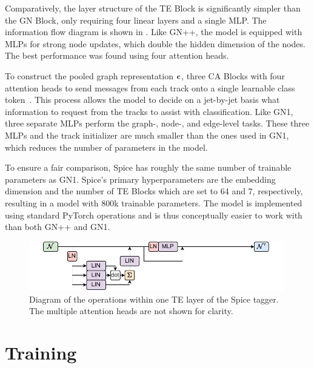 Comparatively, the layer structure of the TE Block is significantly simpler than the GN Block, only requiring four linear layers and a single MLP\@.
The information flow diagram is shown in .
Like GN++, the model is equipped with MLPs for strong node updates, which double the hidden dimension of the nodes.
The best performance was found using four attention heads.

To construct the pooled graph representation $\mathbf{c}$, three CA Blocks with four attention heads to send messages from each track onto a single learnable class token~\cite{GoingDeeper}.
This process allows the model to decide on a jet-by-jet basis what information to request from the tracks to assist with classification.
Like GN1, three separate MLPs perform the graph-, node-, and edge-level tasks.
These three MLPs and the track initializer are much smaller than the ones used in GN1, which reduces the number of parameters in the model.

To ensure a fair comparison, Spice has roughly the same number of trainable parameters as GN1.
Spice's primary hyperparameters are the embedding dimension and the number of TE Blocks which are set to 64 and 7, respectively, resulting in a model with 800k trainable parameters.
The model is implemented using standard PyTorch operations and is thus conceptually easier to work with than both GN++ and GN1.

\begin{figure}[h!]
    \centering
    \includegraphics[width=0.99\textwidth]{figures/flavour_tagging/spice.pdf}
    \caption{Diagram of the operations within one TE layer of the Spice tagger. The multiple attention heads are not shown for clarity.}
    \label{fig:spice_graph}
\end{figure}

\section{Training}

